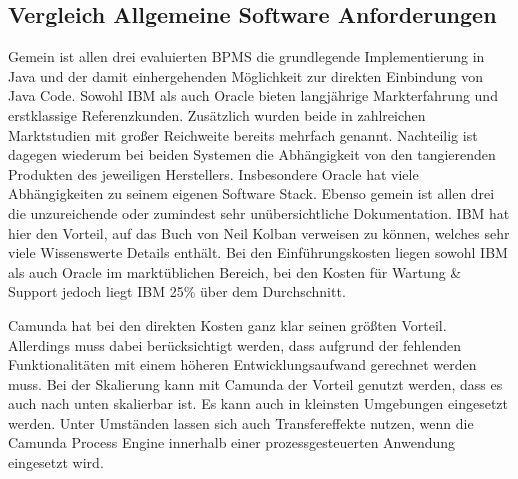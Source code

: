 
\subsection{Vergleich Allgemeine Software Anforderungen}
Gemein ist allen drei evaluierten \ac{BPMS} die grundlegende Implementierung in Java und der damit einhergehenden Möglichkeit zur direkten Einbindung von Java Code. Sowohl IBM als auch Oracle bieten langjährige Markterfahrung und erstklassige Referenzkunden. Zusätzlich wurden beide in zahlreichen Marktstudien mit großer Reichweite bereits mehrfach genannt. Nachteilig ist dagegen wiederum bei beiden Systemen die Abhängigkeit von den tangierenden Produkten des jeweiligen Herstellers. Insbesondere Oracle hat viele Abhängigkeiten zu seinem eigenen Software Stack. 
Ebenso gemein ist allen drei die unzureichende oder zumindest sehr unübersichtliche Dokumentation. IBM hat hier den Vorteil, auf das Buch von Neil Kolban verweisen zu können, welches sehr viele Wissenswerte Details enthält. Bei den Einführungskosten liegen sowohl IBM als auch Oracle im marktüblichen Bereich, bei den Kosten für Wartung \& Support jedoch liegt IBM 25\% über dem Durchschnitt.

\smallskip\noindent Camunda hat bei den direkten Kosten ganz klar seinen größten Vorteil. Allerdings muss dabei berücksichtigt werden, dass aufgrund der fehlenden Funktionalitäten mit einem höheren Entwicklungsaufwand gerechnet werden muss. Bei der Skalierung kann mit Camunda der Vorteil genutzt werden, dass es auch nach unten skalierbar ist. Es kann auch in kleinsten Umgebungen eingesetzt werden. Unter Umständen lassen sich auch Transfereffekte nutzen, wenn die Camunda Process Engine innerhalb einer prozessgesteuerten Anwendung eingesetzt wird. 

